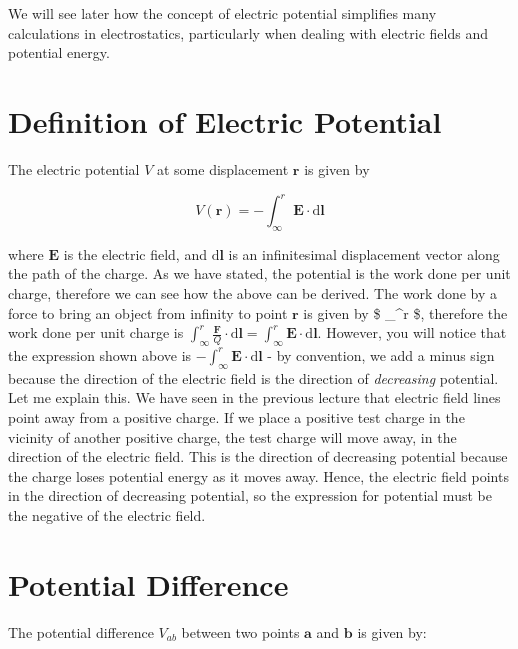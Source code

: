 \documentclass[
  letterpaper,
  DIV=11,
  numbers=noendperiod]{scrreprt}
\begin{document}
We will see later how the concept of electric potential simplifies many
calculations in electrostatics, particularly when dealing with electric
fields and potential energy.

\section{Definition of Electric
Potential}\label{definition-of-electric-potential}

The electric potential \(V\) at some displacement
\(\mathrm{\mathbf{r}}\) is given by

\[ V(\mathrm{\mathbf{r}}) = −\int_{\infty}^r \mathrm{\mathbf{E}}\cdot \mathrm{d}\mathrm{\mathbf{l}}\]

where \(\mathrm{\mathbf{E}}\) is the electric field, and
\(\mathrm{d}\mathrm{\mathbf{l}}\) is an infinitesimal displacement
vector along the path of the charge. As we have stated, the potential is
the work done per unit charge, therefore we can see how the above can be
derived. The work done by a force to bring an object from infinity to
point \(\mathrm{\mathbf{r}}\) is given by \$ \int\_\infty\^{}r
 \cdot {}\$, therefore the
work done per unit charge is
\(\int_\infty^r \frac{\mathrm{\mathbf{F}}}{Q} \cdot \mathrm{d}\mathrm{\mathbf{l}}= \int_\infty^r \mathrm{\mathbf{E}}\cdot \mathrm{d}\mathrm{\mathbf{l}}\).
However, you will notice that the expression shown above is
\(- \int_\infty^r \mathrm{\mathbf{E}}\cdot \mathrm{d}\mathrm{\mathbf{l}}\)
- by convention, we add a minus sign because the direction of the
electric field is the direction of \emph{decreasing} potential. Let me
explain this. We have seen in the previous lecture that electric field
lines point away from a positive charge. If we place a positive test
charge in the vicinity of another positive charge, the test charge will
move away, in the direction of the electric field. This is the direction
of decreasing potential because the charge loses potential energy as it
moves away. Hence, the electric field points in the direction of
decreasing potential, so the expression for potential must be the
negative of the electric field.

\section{Potential Difference}\label{potential-difference}

The potential difference \(V_{ab}\) between two points
\(\mathrm{\mathbf{a}}\) and \(\mathrm{\mathbf{b}}\) is given by:
\end{document}
